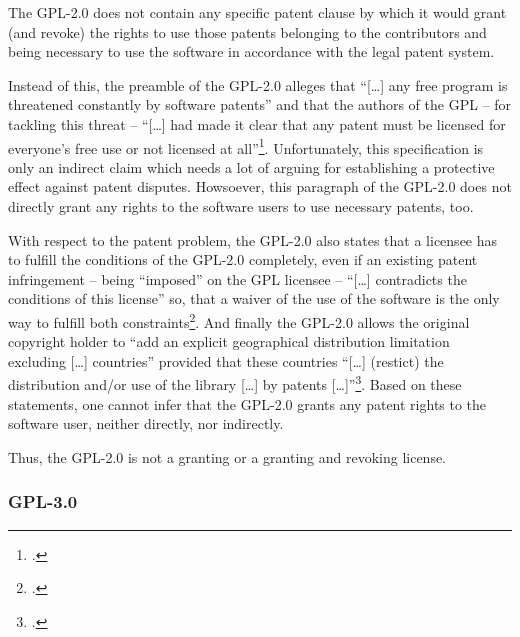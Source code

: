 The GPL-2.0 does not contain any specific patent clause by which it would grant
(and revoke) the rights to use those patents belonging to the contributors and 
being necessary to use the software in accordance with the legal patent system.

Instead of this, the preamble of the GPL-2.0 alleges that \enquote{[\ldots] any
free program is threatened constantly by software patents} and that the authors
of the GPL -- for tackling this threat -- \enquote{[\ldots] had made it clear
that any patent must be licensed for everyone's free use or not licensed at
all}\footcite[cf.][\nopage wp, Preamble]{Gpl20OsiLicense1991a}. Unfortunately,
this specification is only an indirect claim which needs a lot of arguing for
establishing a protective effect against patent disputes. Howsoever, this
paragraph of the GPL-2.0 does not directly grant any rights to the software
users to use necessary patents, too.

With respect to the patent problem, the GPL-2.0 also states that a licensee has
to fulfill the conditions of the GPL-2.0 completely, even if an existing patent
infringement -- being \enquote{imposed} on the GPL licensee -- \enquote{[\ldots]
contradicts the conditions of this license} so, that a waiver of the use of the
software is the only way to fulfill both constraints\footcite[cf.][\nopage wp.\
§11]{Gpl20OsiLicense1991a}. And finally the GPL-2.0 allows the original
copyright holder to \enquote{add an explicit geographical distribution
limitation excluding [\ldots] countries} provided that these countries
\enquote{[\ldots] (restict) the distribution and/or use of the library [\ldots]
by patents [\ldots]}\footcite[cf.][\nopage wp.\ §12]{Gpl20OsiLicense1991a}.
Based on these statements, one cannot infer that the GPL-2.0 grants any patent
rights to the software user, neither directly, nor indirectly.

Thus, the GPL-2.0 is not a granting or a granting and revoking license.

\subsubsection {GPL-3.0}\label{subsec:Gpl30PatentClause}

